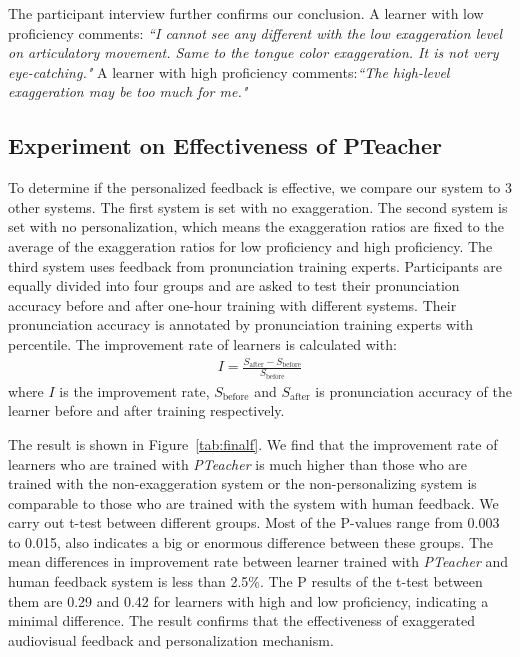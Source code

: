 \documentclass[sigconf]{acmart}
\begin{document}
The participant interview further confirms our conclusion. A learner with low proficiency comments: \emph{``I cannot see any different with the low exaggeration level on articulatory movement. Same to the tongue color exaggeration. It is not very eye-catching."} A learner with high proficiency comments:\emph{``The high-level exaggeration may be too much for me."}

\subsection[Experiment on Effectiveness of PTeacher]{ Experiment on Effectiveness of PTeacher}
\label{sec:verify}
\label{sec:exp10}
To determine if the personalized feedback is effective, we compare our system to 3 other systems.
The first system is set with no exaggeration. %
The second system is set with no personalization, which means the exaggeration ratios are fixed to the average of the exaggeration ratios for low proficiency and high proficiency. %
The third system uses feedback from pronunciation training experts. %
Participants are equally divided into four groups and are asked to test their pronunciation accuracy before and after one-hour training with different systems. %
Their pronunciation accuracy is annotated by pronunciation training experts with percentile.
The improvement rate of learners is calculated with:
\begin{align}
I=\frac{S_{\text{after}}-S_{\text{before}}}{S_{\text{before}}}
\end{align}
where $I$ is the improvement rate, $S_{\text{before}}$ and $S_{\text{after}}$ is pronunciation accuracy of the learner before and after training respectively. %

The result is shown in Figure~\ref{tab:finalf}. %
We find that the improvement rate of learners who are trained with \textit{PTeacher} is much higher than those who are trained with the non-exaggeration system or the non-personalizing system is comparable to those who are trained with the system with human feedback. %
We carry out t-test between different groups. %
Most of the P-values range from 0.003 to 0.015, also indicates a big or enormous difference between these groups. %
The mean differences in improvement rate between learner trained with \textit{PTeacher} and human feedback system is less than 2.5\%. 
The P results of the t-test between them are 0.29 and 0.42 for learners with high and low proficiency, indicating a minimal difference. %
The result confirms that the effectiveness of exaggerated audiovisual feedback and personalization mechanism. %
\end{document}
